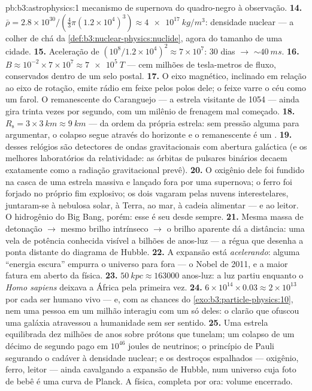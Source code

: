 \begin{solution}{pb:b3:astrophysics:1}
mecanismo de supernova do quadro-negro à observação.
\textbf{14.} $\bar\rho = 2.8\times10^{30}/(\tfrac43\pi
(1.2\times10^4)^3) \approx \qty{4e17}{kg/m^3}$: densidade
nuclear --- a colher de chá da \cref{def:b3:nuclear-physics:nuclide},
agora do tamanho de uma cidade.
\textbf{15.} Aceleração de $(10^8/1.2\times10^4)^2 \approx
7\times10^{7}$: 30 dias $\to$ ${\sim}\qty{40}{ms}$.
\textbf{16.} $B \approx 10^{-2}\times7\times10^{7} \approx
\qty{7e5}{T}$ --- cem milhões de tesla-metros de fluxo,
conservados dentro de um selo postal.
\textbf{17.} O eixo magnético, inclinado em relação ao eixo de rotação,
emite rádio em feixe pelos polos dele; o feixe varre o céu como um
farol. O remanescente do Caranguejo --- a estrela visitante de 1054 ---
ainda gira trinta vezes por segundo, com um milênio de frenagem mal
começado.
\textbf{18.} $R_{\text{s}} = 3\times\qty{3}{km} \approx
\qty{9}{km}$ --- da ordem da própria estrela: sem
pressão alguma para argumentar, o colapso segue através do horizonte
e o remanescente é um .
\textbf{19.}  desses relógios são detectores de ondas
gravitacionais com abertura galáctica (e os melhores laboratórios da
relatividade: as órbitas de pulsares binários decaem exatamente como a
radiação gravitacional prevê).
\textbf{20.} O oxigênio dele foi fundido na casca de uma estrela massiva
e lançado fora por uma supernova; o ferro foi forjado no
próprio fim explosivo; os dois vagaram pelas nuvens interestelares,
juntaram-se à nebulosa solar, à Terra, ao mar, à cadeia alimentar
--- e ao leitor. O hidrogênio do Big Bang, porém: esse é
seu desde sempre.
\textbf{21.} Mesma massa de detonação $\to$ mesmo brilho
intrínseco $\to$ o brilho aparente dá a distância: uma vela
de potência conhecida visível a bilhões de anos-luz ---
a régua que desenha a ponta distante do diagrama de Hubble.
\textbf{22.} A expansão está \emph{acelerando}: alguma
``energia escura'' empurra o universo para fora --- o Nobel de 2011,
e a maior fatura em aberto da física.
\textbf{23.} $\qty{50}{kpc} \approx 163000$ anos-luz: a
luz partiu enquanto o \emph{Homo sapiens} deixava a África pela primeira vez.
\textbf{24.} $6\times10^{14}\times0.03 \approx 2\times10^{13}$
por cada ser humano vivo --- e, com as chances do
\cref{exo:b3:particle-physics:10}, nem uma pessoa em um
milhão interagiu com um só deles: o clarão que ofuscou uma
galáxia atravessou a humanidade sem ser sentido.
\textbf{25.} Uma estrela equilibrada dez milhões de anos sobre prótons
que tunelam; um colapso de um décimo de segundo pago em $10^{46}$
joules de neutrinos; o princípio de Pauli segurando o cadáver à
densidade nuclear; e os destroços espalhados --- oxigênio, ferro,
leitor --- ainda cavalgando a expansão de Hubble, num universo cuja
foto de bebê é uma curva de Planck. A física, completa por ora:
volume encerrado.
\end{solution}
